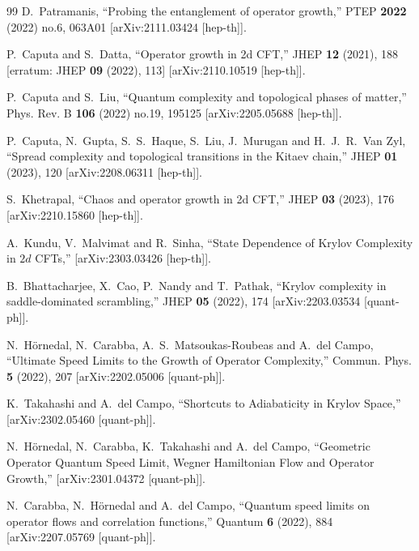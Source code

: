 \documentclass[aps,prl,twocolumn,showpacs,preprintnumbers,amsmath,amssymb]{revtex4-1}
\begin{document}
\begin{thebibliography}{99}
D.~Patramanis,
``Probing the entanglement of operator growth,''
PTEP \textbf{2022} (2022) no.6, 063A01
[arXiv:2111.03424 [hep-th]].

P.~Caputa and S.~Datta,
``Operator growth in 2d CFT,''
JHEP \textbf{12} (2021), 188
[erratum: JHEP \textbf{09} (2022), 113]
[arXiv:2110.10519 [hep-th]].

P.~Caputa and S.~Liu,
``Quantum complexity and topological phases of matter,''
Phys. Rev. B \textbf{106} (2022) no.19, 195125
[arXiv:2205.05688 [hep-th]].

P.~Caputa, N.~Gupta, S.~S.~Haque, S.~Liu, J.~Murugan and H.~J.~R.~Van Zyl,
``Spread complexity and topological transitions in the Kitaev chain,''
JHEP \textbf{01} (2023), 120
[arXiv:2208.06311 [hep-th]].

S.~Khetrapal,
``Chaos and operator growth in 2d CFT,''
JHEP \textbf{03} (2023), 176
[arXiv:2210.15860 [hep-th]].

A.~Kundu, V.~Malvimat and R.~Sinha,
``State Dependence of Krylov Complexity in $2d$ CFTs,''
[arXiv:2303.03426 [hep-th]].

B.~Bhattacharjee, X.~Cao, P.~Nandy and T.~Pathak,
``Krylov complexity in saddle-dominated scrambling,''
JHEP \textbf{05} (2022), 174
[arXiv:2203.03534 [quant-ph]].

N.~H\"ornedal, N.~Carabba, A.~S.~Matsoukas-Roubeas and A.~del Campo,
``Ultimate Speed Limits to the Growth of Operator Complexity,''
Commun. Phys. \textbf{5} (2022), 207
[arXiv:2202.05006 [quant-ph]].

K.~Takahashi and A.~del Campo,
``Shortcuts to Adiabaticity in Krylov Space,''
[arXiv:2302.05460 [quant-ph]].

N.~H\"ornedal, N.~Carabba, K.~Takahashi and A.~del Campo,
``Geometric Operator Quantum Speed Limit, Wegner Hamiltonian Flow and Operator Growth,''
[arXiv:2301.04372 [quant-ph]].

N.~Carabba, N.~H\"ornedal and A.~del Campo,
``Quantum speed limits on operator flows and correlation functions,''
Quantum \textbf{6} (2022), 884
[arXiv:2207.05769 [quant-ph]].


\end{thebibliography}
\end{document}
